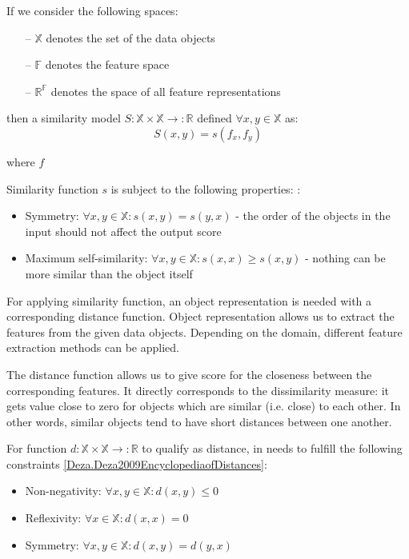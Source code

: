 If we consider the following spaces: 
\begin{itemize}
	\item[--]  $\mathds{X}$ denotes the set of the data objects
	\item[--]  $\mathds{F}$ denotes the feature space
	\item[--]  $\mathds{R} ^  \mathds{F}$ denotes the space of all feature representations
\end{itemize}

then a similarity model $S:\mathds{X} \times \mathds{X} \rightarrow :\mathds{R}$ defined $\forall x,y \in \mathds{X}$ as:
\begin{equation}
	S(x,y) = s(f_{x},f_{y})
\end{equation}

where $f$ 

Similarity function $s$ is subject to the following properties: \cite{Santini:1999:SM:317043.317048}:

\begin{itemize}
	\item Symmetry: $\forall x,y \in \mathds{X}: s(x,y) = s(y,x)$ - the order of the objects in the input should not affect the output score
	\item Maximum self-similarity: $\forall x,y \in \mathds{X}: s(x,x) \geqslant s(x,y)$ - nothing can be more similar than the object itself
\end{itemize}

For applying similarity function, an object representation is needed with a corresponding distance function. 
Object representation allows us to extract the features from the given data objects. 
Depending on the domain, different feature extraction methods can be applied. 

The distance function allows us to give score for the closeness between the corresponding features.
It directly corresponds to the dissimilarity measure: it gets value close to zero for objects which are similar (i.e. close) to each other. 
In other words, similar objects tend to have short distances between one another.

For function $d:\mathds{X} \times \mathds{X} \rightarrow :\mathds{R}$ to qualify as distance, in needs to fulfill the following constraints \ref{Deza.Deza2009EncyclopediaofDistances}:
\begin{itemize}
	\item Non-negativity: $\forall x,y \in \mathds{X}: d(x,y) \leqslant 0$
	\item Reflexivity: $\forall x \in \mathds{X}: d(x,x) = 0$
	\item Symmetry: $\forall x,y \in \mathds{X}: d(x,y) = d(y,x)$
\end{itemize}

